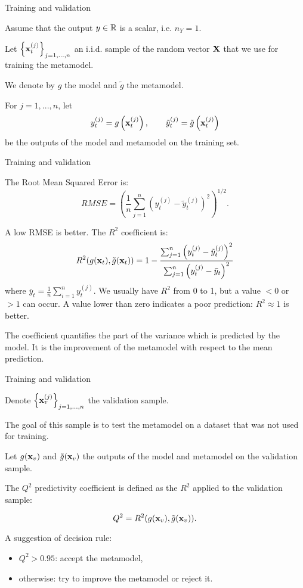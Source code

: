 \documentclass{beamer}
\begin{document}

\begin{frame}[t]{Training and validation}

Assume that the output $y\in\mathbb{R}$ is a scalar, i.e. $n_Y = 1$. 

Let $\left\{{\bf x}^{(j)}_t\right\}_{j=1,...,n}$ an i.i.d. sample 
of the random vector ${\bf X}$ that we use for training the 
metamodel. 

We denote by $g$ the model and $\tilde{g}$ the metamodel. 

For $j=1,...,n$, let 
$$
y^{(j)}_t = g\left({\bf x}^{(j)}_t\right), \qquad 
\tilde{y}^{(j)}_t = \tilde{g}\left({\bf x}^{(j)}_t\right)
$$
 be the outputs of the model and metamodel 
on the training set.
\end{frame}


\begin{frame}[t]{Training and validation}

The Root Mean Squared Error is: 
$$
RMSE
= \left( \frac{1}{n} \sum_{j=1}^n \left( y^{(j)}_t - \tilde{y}^{(j)}_t \right)^2 \right)^{1/2}.
$$

A low RMSE is better. 
The $R^2$ coefficient is: 
$$
R^2(g({\bf x}_t),\tilde{g}({\bf x}_t)) 
= 1 - \frac{ \sum_{j=1}^n \left( y^{(j)}_t - \tilde{y}^{(j)}_t \right)^2}
{ \sum_{j=1}^n \left( y^{(j)}_t - \bar{y}_t \right)^2 }
$$
where $\bar{y}_t = \frac{1}{n} \sum_{i=1}^n y^{(j)}_t$. 
We usually have $R^2$ from 0 to 1, but a value $<0$ or $>1$ can occur. 
A value lower than zero indicates a poor prediction: $R^2 \approx 1$ 
is better. 

The coefficient quantifies the part of the variance which is predicted by the 
model. It is the improvement of the metamodel with respect to the 
mean prediction. 

\end{frame}


\begin{frame}[t]{Training and validation}

Denote $\left\{{\bf x}^{(j)}_v\right\}_{j=1,...,n}$ the 
validation sample. 

The goal of this sample is to test the metamodel on a dataset 
that was not used for training.

Let $g({\bf x}_v)$ and $\tilde{g}({\bf x}_v)$ the outputs of the 
model and metamodel on the validation sample.

The $Q^2$ predictivity coefficient is defined as the $R^2$ 
applied to the validation sample:

$$
Q^2 = R^2(g({\bf x}_v),\tilde{g}({\bf x}_v)).
$$

A suggestion of decision rule:
\begin{itemize}
\item $Q^2>0.95$: accept the metamodel,
\item otherwise: try to improve the metamodel or reject it.
\end{itemize}

\end{frame}
\end{document}
